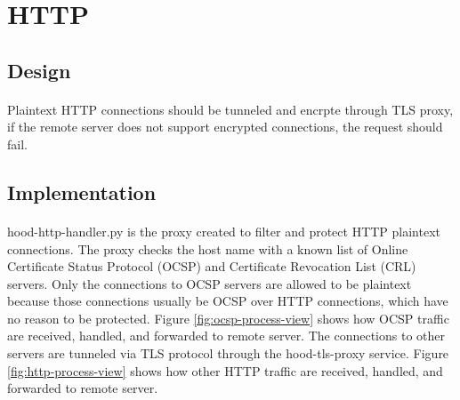 \documentclass[mscthesis]{usiinfthesis}
\begin{document}
\section{HTTP}
\subsection{Design}
\paragraph{}
Plaintext HTTP connections should be tunneled and encrpte through TLS proxy, if the remote server does not support encrypted connections, the request should fail.
\subsection{Implementation}
\paragraph{}
hood-http-handler.py is the proxy created to filter and protect HTTP plaintext connections. The proxy checks the host name with a known list of Online Certificate Status Protocol (OCSP) and Certificate Revocation List (CRL) servers. Only the connections to OCSP servers are allowed to be plaintext because those connections usually be OCSP over HTTP connections, which have no reason to be protected. Figure \ref{fig:ocsp-process-view} shows how OCSP traffic are received, handled, and forwarded to remote server. The connections to other servers are tunneled via TLS protocol through the hood-tls-proxy service. Figure \ref{fig:http-process-view} shows how other HTTP traffic are received, handled, and forwarded to remote server.
\end{document}
